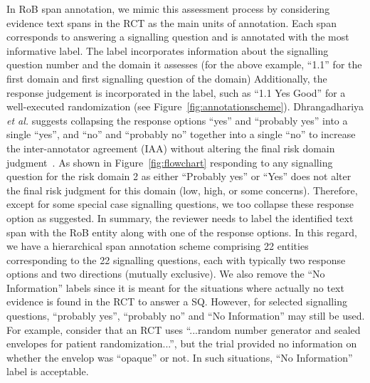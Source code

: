 \documentclass[sn-mathphys,Numbered]{sn-jnl}%
\theoremstyle{thmstyleone}%
\theoremstyle{thmstyletwo}%
\theoremstyle{thmstylethree}%
\begin{document}
In RoB span annotation, we mimic this assessment process by considering evidence text spans in the RCT as the main units of annotation. 
Each span corresponds to answering a signalling question and is annotated with the most informative label. 
The label incorporates information about the signalling question number and the domain it assesses (for the above example, ``1.1'' for the first domain and first signalling question of the domain)
Additionally, the response judgement is incorporated in the label, such as ``1.1 Yes Good'' for a well-executed randomization (see Figure~\ref{fig:annotationscheme}).
Dhrangadhariya \textit{et al.} suggests collapsing the response options ``yes'' and ``probably yes'' into a single ``yes'', and ``no'' and ``probably no'' together into a single ``no'' to increase the inter-annotator agreement (IAA) without altering the final risk domain judgment~\cite{dhrangadhariya2023first}.
As shown in Figure~\ref{fig:flowchart} responding to any signalling question for the risk domain 2 as either ``Probably yes'' or ``Yes'' does not alter the final risk judgment for this domain (low, high, or some concerns).
Therefore, except for some special case signalling questions, we too collapse these response option as suggested.
In summary, the reviewer needs to label the identified text span with the RoB entity along with one of the response options.
In this regard, we have a hierarchical span annotation scheme comprising 22 entities corresponding to the 22 signalling questions, each with typically two response options and two directions (mutually exclusive).
We also remove the ``No Information'' labels since it is meant for the situations where actually no text evidence is found in the RCT to answer a SQ.
However, for selected signalling questions, ``probably yes'', ``probably no'' and ``No Information'' may still be used.
For example, consider that an RCT uses ``...random number generator and sealed envelopes for patient randomization...'', but the trial provided no information on whether the envelop was ``opaque'' or not.
In such situations, ``No Information'' label is acceptable.
\end{document}
